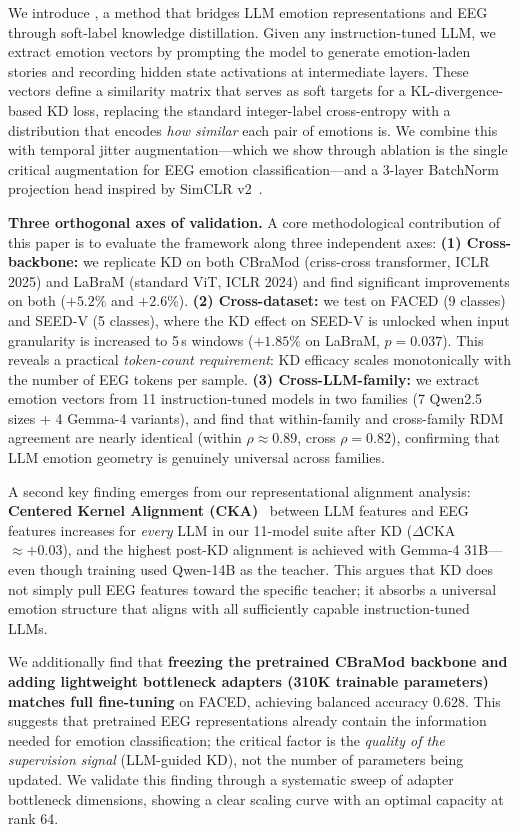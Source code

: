 We introduce \ours, a method that bridges LLM emotion representations and EEG through soft-label knowledge distillation. Given any instruction-tuned LLM, we extract emotion vectors by prompting the model to generate emotion-laden stories and recording hidden state activations at intermediate layers. These vectors define a similarity matrix that serves as soft targets for a KL-divergence-based KD loss, replacing the standard integer-label cross-entropy with a distribution that encodes \emph{how similar} each pair of emotions is. We combine this with temporal jitter augmentation---which we show through ablation is the single critical augmentation for EEG emotion classification---and a 3-layer BatchNorm projection head inspired by SimCLR v2~\cite{simclr_v2}.

\textbf{Three orthogonal axes of validation.} A core methodological contribution of this paper is to evaluate the framework along three independent axes:
\textbf{(1) Cross-backbone:} we replicate KD on both CBraMod (criss-cross transformer, ICLR 2025) and LaBraM (standard ViT, ICLR 2024) and find significant improvements on both ($+5.2\%$ and $+2.6\%$).
\textbf{(2) Cross-dataset:} we test on FACED (9 classes) and SEED-V (5 classes), where the KD effect on SEED-V is unlocked when input granularity is increased to 5\,s windows ($+1.85\%$ on LaBraM, $p = 0.037$). This reveals a practical \emph{token-count requirement}: KD efficacy scales monotonically with the number of EEG tokens per sample.
\textbf{(3) Cross-LLM-family:} we extract emotion vectors from 11 instruction-tuned models in two families (7 Qwen2.5 sizes + 4 Gemma-4 variants), and find that within-family and cross-family RDM agreement are nearly identical (within $\rho \approx 0.89$, cross $\rho = 0.82$), confirming that LLM emotion geometry is genuinely universal across families.

A second key finding emerges from our representational alignment analysis: \textbf{Centered Kernel Alignment (CKA)}~\cite{kornblith2019cka} between LLM features and EEG features increases for \emph{every} LLM in our 11-model suite after KD ($\Delta$CKA $\approx +0.03$), and the highest post-KD alignment is achieved with Gemma-4 31B---even though training used Qwen-14B as the teacher. This argues that KD does not simply pull EEG features toward the specific teacher; it absorbs a universal emotion structure that aligns with all sufficiently capable instruction-tuned LLMs.

We additionally find that \textbf{freezing the pretrained CBraMod backbone and adding lightweight bottleneck adapters (310K trainable parameters) matches full fine-tuning} on FACED, achieving balanced accuracy $\mathbf{0.628}$. This suggests that pretrained EEG representations already contain the information needed for emotion classification; the critical factor is the \emph{quality of the supervision signal} (LLM-guided KD), not the number of parameters being updated. We validate this finding through a systematic sweep of adapter bottleneck dimensions, showing a clear scaling curve with an optimal capacity at rank 64.

